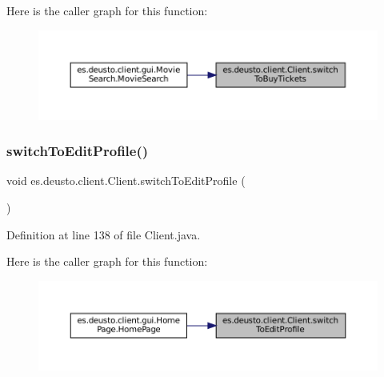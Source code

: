 Here is the caller graph for this function\+:
\nopagebreak
\begin{figure}[H]
\begin{center}
\leavevmode
\includegraphics[width=350pt]{classes_1_1deusto_1_1client_1_1_client_a8ce2f6d11e690d42dbe756d10ccee160_icgraph}
\end{center}
\end{figure}
\mbox{\label{classes_1_1deusto_1_1client_1_1_client_afefdad03c88bee0a0427af249604cf19}} 
\subsubsection{\texorpdfstring{switchToEditProfile()}{switchToEditProfile()}}
{\footnotesize\ttfamily void es.\+deusto.\+client.\+Client.\+switch\+To\+Edit\+Profile (\begin{DoxyParamCaption}{ }\end{DoxyParamCaption})}



Definition at line 138 of file Client.\+java.

Here is the caller graph for this function\+:
\nopagebreak
\begin{figure}[H]
\begin{center}
\leavevmode
\includegraphics[width=350pt]{classes_1_1deusto_1_1client_1_1_client_afefdad03c88bee0a0427af249604cf19_icgraph}
\end{center}
\end{figure}
\mbox{\label{classes_1_1deusto_1_1client_1_1_client_aff17deef622ce410b473d4dadad36343}} 
